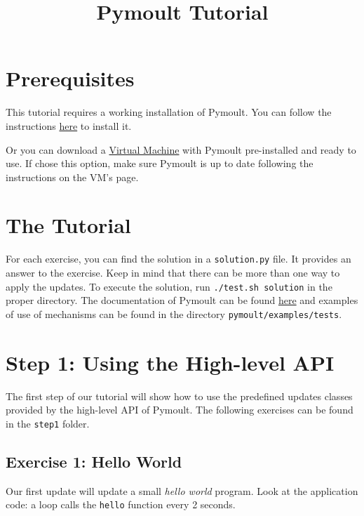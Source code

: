 \documentclass{article}
\begin{document}
\title{Pymoult Tutorial}
\date{}
\maketitle

\section{Prerequisites}

This tutorial requires a working installation of Pymoult. You can
follow the instructions
\href{https://bitbucket.org/smartinezgd/pymoult/wiki/Home}{here} to
install it.

Or you can download a \href{https://bitbucket.org/smartinezgd/pymoult/wiki/Virtual\%20Machine}{Virtual Machine} with Pymoult pre-installed and
ready to use. If chose this option, make sure Pymoult is up to date
following the instructions on the VM's page.  

\section{The Tutorial}

For each exercise, you can find the solution in a \texttt{solution.py}
file. It provides an answer to the exercise. Keep in mind that there
can be more than one way to apply the updates.  To execute the
solution, run \texttt{./test.sh solution} in the proper directory.
The documentation of Pymoult can be found
\href{https://bitbucket.org/smartinezgd/pymoult/wiki/Pymoult\%20manual}{here}
and examples of use of mechanisms can be found in the directory
\texttt{pymoult/examples/tests}.

\section{Step 1: Using the High-level API}

The first step of our tutorial will show how to use the predefined
updates classes provided by the high-level API of Pymoult. The
following exercises can be found in the \texttt{step1} folder. 

\subsection{Exercise 1: Hello World}

Our first update will update a small \textit{hello world}
program. Look at the application code: a loop calls the
\texttt{hello} function every 2 seconds.
\end{document}
